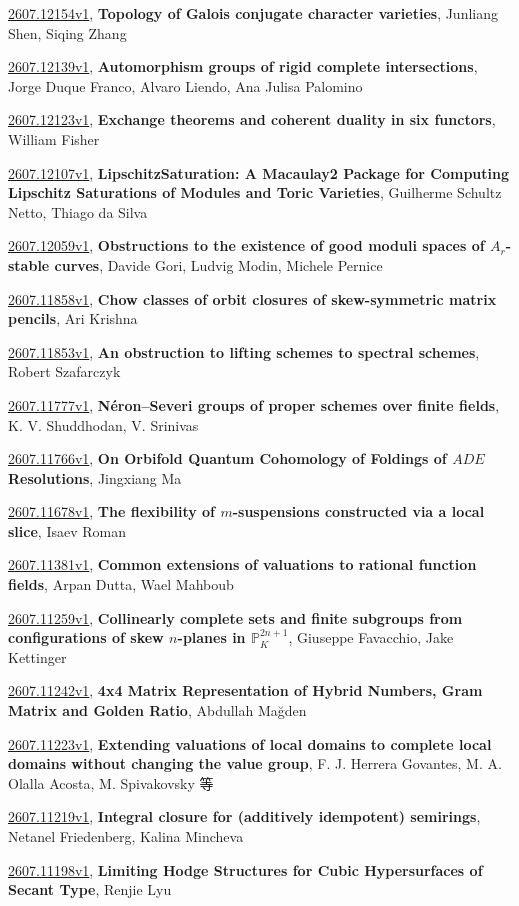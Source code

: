 \documentclass[9pt, a4paper]{article}
\theoremstyle{plain}
\theoremstyle{definition}
\theoremstyle{remark}
\newcommand{\arxiv}[3]{\href{https://arxiv.org/abs/#1}{#1}, \textbf{\textcolor{arxivblue}{#2}}, #3}
\begin{document}
\arxiv{2607.12154v1}{Topology of Galois conjugate character varieties}{Junliang Shen, Siqing Zhang}

\arxiv{2607.12139v1}{Automorphism groups of rigid complete intersections}{Jorge Duque Franco, Alvaro Liendo, Ana Julisa Palomino}

\arxiv{2607.12123v1}{Exchange theorems and coherent duality in six functors}{William Fisher}

\arxiv{2607.12107v1}{LipschitzSaturation: A Macaulay2 Package for Computing Lipschitz Saturations of Modules and Toric Varieties}{Guilherme Schultz Netto, Thiago da Silva}

\arxiv{2607.12059v1}{Obstructions to the existence of good moduli spaces of $A_r$-stable curves}{Davide Gori, Ludvig Modin, Michele Pernice}

\arxiv{2607.11858v1}{Chow classes of orbit closures of skew-symmetric matrix pencils}{Ari Krishna}

\arxiv{2607.11853v1}{An obstruction to lifting schemes to spectral schemes}{Robert Szafarczyk}

\arxiv{2607.11777v1}{Néron--Severi groups of proper schemes over finite fields}{K. V. Shuddhodan, V. Srinivas}

\arxiv{2607.11766v1}{On Orbifold Quantum Cohomology of Foldings of $ADE$ Resolutions}{Jingxiang Ma}

\arxiv{2607.11678v1}{The flexibility of $m$-suspensions constructed via a local slice}{Isaev Roman}

\arxiv{2607.11381v1}{Common extensions of valuations to rational function fields}{Arpan Dutta, Wael Mahboub}

\arxiv{2607.11259v1}{Collinearly complete sets and finite subgroups from configurations of skew $n$-planes in $\mathbb P^{2n+1}_K$}{Giuseppe Favacchio, Jake Kettinger}

\arxiv{2607.11242v1}{4x4 Matrix Representation of Hybrid Numbers, Gram Matrix and Golden Ratio}{Abdullah Mağden}

\arxiv{2607.11223v1}{Extending valuations of local domains to complete local domains without changing the value group}{F. J. Herrera Govantes, M. A. Olalla Acosta, M. Spivakovsky 等}

\arxiv{2607.11219v1}{Integral closure for (additively idempotent) semirings}{Netanel Friedenberg, Kalina Mincheva}

\arxiv{2607.11198v1}{Limiting Hodge Structures for Cubic Hypersurfaces of Secant Type}{Renjie Lyu}

\end{document}
